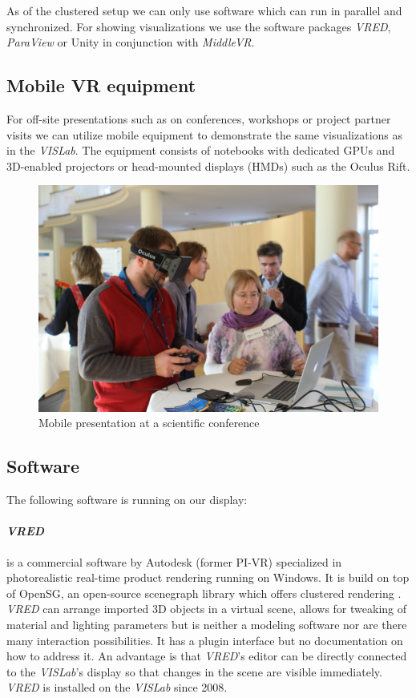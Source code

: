 As of the clustered setup we can only use software which can run in
parallel and synchronized. For showing visualizations we use the
software packages \emph{VRED}, \emph{ParaView} or Unity in conjunction with \emph{MiddleVR}.

\subsection{Mobile VR equipment}
\label{mobile-vr-equipment}

For off-site presentations such as on conferences, workshops or project
partner visits we can utilize mobile equipment to demonstrate the same
visualizations as in the \emph{VISLab}. The equipment consists of notebooks
with dedicated GPUs and 3D-enabled projectors or head-mounted displays
(HMDs) such as the Oculus Rift.

\begin{figure}
  \includegraphics[width=\linewidth]{images/rift.jpg}
\caption{Mobile presentation at a scientific conference}
\label{fig:rift}
\end{figure}

\subsection{Software}
\label{software}

The following software is running on our display:

\paragraph{\emph{VRED}}
is a commercial software by Autodesk (former PI-VR) specialized in
photorealistic real-time product rendering running on Windows. It is
build on top of OpenSG, an open-source scenegraph library which offers
clustered rendering \cite{opensg}. \emph{VRED} can arrange imported 3D
objects in a virtual scene, allows for tweaking of material and lighting
parameters but is neither a modeling software nor are there many
interaction possibilities. It has a plugin interface but no
documentation on how to address it. An advantage is that \emph{VRED}'s editor
can be directly connected to the \emph{VISLab}'s display so that changes in the
scene are visible immediately. \emph{VRED} is installed on the \emph{VISLab} since
2008.

